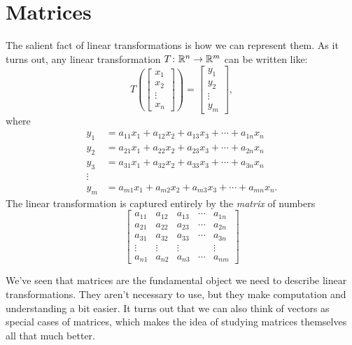     \section{Matrices}
        
        The salient fact of linear transformations is how we can represent them.  As it turns out, any linear transformation $T\colon \mathbb{R}^n \to \mathbb{R}^m$ can be written like:
        \[
        T\left( \begin{bmatrix} x_1 \\ x_2 \\ \vdots \\ x_n \end{bmatrix}\right)
        = \begin{bmatrix} y_1 \\ y_2 \\ \vdots \\ y_m \end{bmatrix},
        \]
        where 
        \begin{align*}
            y_1 &= a_{11} x_1 + a_{12} x_2 + a_{13} x_3 + \cdots + a_{1n} x_n\\
            y_2 &= a_{21} x_1 + a_{22} x_2 + a_{23} x_3 + \cdots + a_{2n} x_n\\
            y_3 &= a_{31} x_1 + a_{32} x_2 + a_{33} x_3 + \cdots + a_{3n} x_n\\
            \vdots\\
            y_m &= a_{m1} x_1 + a_{m2} x_2 + a_{m3} x_3 + \cdots + a_{mn} x_n.
        \end{align*}
        The linear transformation is captured entirely by the \emph{matrix} of numbers
        \[
        \begin{bmatrix}
        a_{11} & a_{12} & a_{13} & \cdots & a_{1n}\\
        a_{21} & a_{22} & a_{23} & \cdots & a_{2n}\\
        a_{31} & a_{32} & a_{33} & \cdots & a_{3n}\\
        \vdots & \vdots & \vdots & & \vdots \\
        a_{n1} & a_{n2} & a_{n3} & \cdots & a_{nm}
        \end{bmatrix}
        \]
        
        We've seen that matrices are the fundamental object we need to describe linear transformations.  They aren't necessary to use, but they make computation and understanding a bit easier.  It turns out that we can also think of vectors as special cases of matrices, which makes the idea of studying matrices themselves all that much better. 
        
